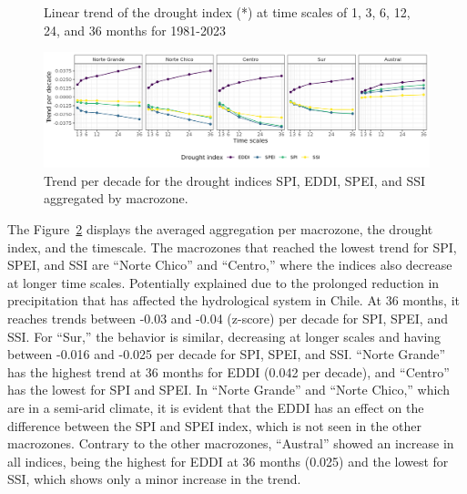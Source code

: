 \documentclass[
  authoryear,
  preprint,
  3p,
  onecolumn]{elsarticle}
\begin{document}
\begin{figure}
\begin{minipage}[t]{0.50\linewidth}
{{}

}

\end{minipage}%

\caption{\label{fig-trendDI}Linear trend of the drought index (*) at
time scales of 1, 3, 6, 12, 24, and 36 months for 1981-2023}

\end{figure}

\elandscape

\begin{figure}[!ht]

{\centering \includegraphics{../output/figs/trend_macrozone_drought_indices.png}

}

\caption{\label{fig-trendDIMacro}Trend per decade for the drought
indices SPI, EDDI, SPEI, and SSI aggregated by macrozone.}

\end{figure}

The Figure~\ref{fig-trendDIMacro} displays the averaged aggregation per
macrozone, the drought index, and the timescale. The macrozones that
reached the lowest trend for SPI, SPEI, and SSI are ``Norte Chico'' and
``Centro,'' where the indices also decrease at longer time scales.
Potentially explained due to the prolonged reduction in precipitation
that has affected the hydrological system in Chile. At 36 months, it
reaches trends between -0.03 and -0.04 (z-score) per decade for SPI,
SPEI, and SSI. For ``Sur,'' the behavior is similar, decreasing at
longer scales and having between -0.016 and -0.025 per decade for SPI,
SPEI, and SSI. ``Norte Grande'' has the highest trend at 36 months for
EDDI (0.042 per decade), and ``Centro'' has the lowest for SPI and SPEI.
In ``Norte Grande'' and ``Norte Chico,'' which are in a semi-arid
climate, it is evident that the EDDI has an effect on the difference
between the SPI and SPEI index, which is not seen in the other
macrozones. Contrary to the other macrozones, ``Austral'' showed an
increase in all indices, being the highest for EDDI at 36 months (0.025)
and the lowest for SSI, which shows only a minor increase in the trend.
\end{document}
